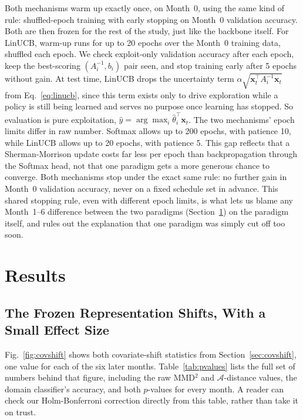 \documentclass[journal]{IEEEtran}
\begin{document}
Both mechanisms warm up exactly once, on Month~0, using the same kind of rule: shuffled-epoch training with early stopping on Month~0 validation accuracy. Both are then frozen for the rest of the study, just like the backbone itself. For LinUCB, warm-up runs for up to 20 epochs over the Month~0 training data, shuffled each epoch. We check exploit-only validation accuracy after each epoch, keep the best-scoring $(A_i^{-1},b_i)$ pair seen, and stop training early after 5 epochs without gain. At test time, LinUCB drops the uncertainty term $\alpha\sqrt{\mathbf{x}_t^\top A_i^{-1}\mathbf{x}_t}$ from Eq.~\eqref{eq:linucb}, since this term exists only to drive exploration while a policy is still being learned and serves no purpose once learning has stopped. So evaluation is pure exploitation, $\hat y = \arg\max_i \hat\theta_i^\top\mathbf{x}_t$. The two mechanisms' epoch limits differ in raw number. Softmax allows up to 200 epochs, with patience 10, while LinUCB allows up to 20 epochs, with patience 5. This gap reflects that a Sherman-Morrison update costs far less per epoch than backpropagation through the Softmax head, not that one paradigm gets a more generous chance to converge. Both mechanisms stop under the exact same rule: no further gain in Month~0 validation accuracy, never on a fixed schedule set in advance. This shared stopping rule, even with different epoch limits, is what lets us blame any Month~1--6 difference between the two paradigms (Section~\ref{sec:results}) on the paradigm itself, and rules out the explanation that one paradigm was simply cut off too soon.

\section{Results}
\label{sec:results}

\subsection{The Frozen Representation Shifts, With a Small Effect Size}
Fig.~\ref{fig:covshift} shows both covariate-shift statistics from Section~\ref{sec:covshift}, one value for each of the six later months. Table~\ref{tab:pvalues} lists the full set of numbers behind that figure, including the raw MMD$^2$ and $\mathcal{A}$-distance values, the domain classifier's accuracy, and both $p$-values for every month. A reader can check our Holm-Bonferroni correction directly from this table, rather than take it on trust.
\end{document}
